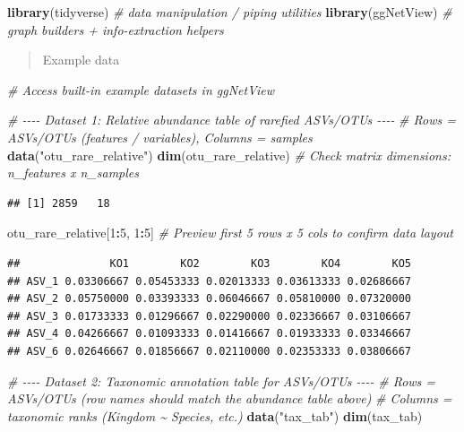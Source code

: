 \documentclass[
]{book}
\newenvironment{Shaded}{\begin{snugshade}}{\end{snugshade}}
\newcommand{\CommentTok}[1]{\textcolor[rgb]{0.56,0.35,0.01}{\textit{#1}}}
\newcommand{\DecValTok}[1]{\textcolor[rgb]{0.00,0.00,0.81}{#1}}
\newcommand{\FunctionTok}[1]{\textcolor[rgb]{0.13,0.29,0.53}{\textbf{#1}}}
\newcommand{\NormalTok}[1]{#1}
\newcommand{\SpecialCharTok}[1]{\textcolor[rgb]{0.81,0.36,0.00}{\textbf{#1}}}
\newcommand{\StringTok}[1]{\textcolor[rgb]{0.31,0.60,0.02}{#1}}
\begin{document}
\begin{Shaded}
\begin{Highlighting}[]
\FunctionTok{library}\NormalTok{(tidyverse)   }\CommentTok{\# data manipulation / piping utilities}
\FunctionTok{library}\NormalTok{(ggNetView)   }\CommentTok{\# graph builders + info{-}extraction helpers}
\end{Highlighting}
\end{Shaded}

\begin{quote}
Example data
\end{quote}

\begin{Shaded}
\begin{Highlighting}[]
\CommentTok{\# Access built{-}in example datasets in ggNetView}

\CommentTok{\# {-}{-}{-}{-} Dataset 1: Relative abundance table of rarefied ASVs/OTUs {-}{-}{-}{-}}
\CommentTok{\# Rows = ASVs/OTUs (features / variables), Columns = samples}
\FunctionTok{data}\NormalTok{(}\StringTok{"otu\_rare\_relative"}\NormalTok{)}
\FunctionTok{dim}\NormalTok{(otu\_rare\_relative)  }\CommentTok{\# Check matrix dimensions: n\_features x n\_samples }
\end{Highlighting}
\end{Shaded}

\begin{verbatim}
## [1] 2859   18
\end{verbatim}

\begin{Shaded}
\begin{Highlighting}[]
\NormalTok{otu\_rare\_relative[}\DecValTok{1}\SpecialCharTok{:}\DecValTok{5}\NormalTok{, }\DecValTok{1}\SpecialCharTok{:}\DecValTok{5}\NormalTok{] }\CommentTok{\# Preview first 5 rows x 5 cols to confirm data layout}
\end{Highlighting}
\end{Shaded}

\begin{verbatim}
##              KO1        KO2        KO3        KO4        KO5
## ASV_1 0.03306667 0.05453333 0.02013333 0.03613333 0.02686667
## ASV_2 0.05750000 0.03393333 0.06046667 0.05810000 0.07320000
## ASV_3 0.01733333 0.01296667 0.02290000 0.02336667 0.03106667
## ASV_4 0.04266667 0.01093333 0.01416667 0.01933333 0.03346667
## ASV_6 0.02646667 0.01856667 0.02110000 0.02353333 0.03806667
\end{verbatim}

\begin{Shaded}
\begin{Highlighting}[]
\CommentTok{\# {-}{-}{-}{-} Dataset 2: Taxonomic annotation table for ASVs/OTUs {-}{-}{-}{-}}
\CommentTok{\# Rows = ASVs/OTUs (row names should match the abundance table above)}
\CommentTok{\# Columns = taxonomic ranks (Kingdom \textasciitilde{} Species, etc.)}
\FunctionTok{data}\NormalTok{(}\StringTok{"tax\_tab"}\NormalTok{)}
\FunctionTok{dim}\NormalTok{(tax\_tab)}
\end{Highlighting}
\end{Shaded}
\end{document}
